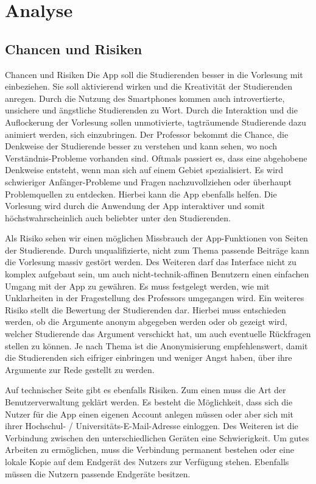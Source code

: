 \chapter{Analyse}
\label{chap:analyse}

\section{Chancen und Risiken}
\label{sec:chances}

Chancen und Risiken
Die App soll die Studierenden besser in die Vorlesung mit einbeziehen. Sie soll aktivierend wirken und die Kreativität der Studierenden anregen. Durch die Nutzung des Smartphones kommen auch introvertierte, unsichere und ängstliche Studierenden zu Wort. Durch die Interaktion und die Auflockerung der Vorlesung sollen unmotivierte, tagträumende Studierende dazu animiert werden, sich einzubringen. 
Der Professor bekommt die Chance, die Denkweise der Studierende besser zu verstehen und kann sehen, wo noch Verständnis-Probleme vorhanden sind. Oftmals passiert es, dass eine abgehobene Denkweise entsteht, wenn man sich auf einem Gebiet spezialisiert. Es wird schwieriger Anfänger-Probleme und Fragen nachzuvollziehen oder überhaupt Problemquellen zu entdecken. Hierbei kann die App ebenfalls helfen. Die Vorlesung wird durch die Anwendung der  App interaktiver und somit höchstwahrscheinlich auch beliebter unter den Studierenden.

Als Risiko sehen wir einen möglichen Missbrauch der App-Funktionen von Seiten der Studierende. Durch unqualifizierte, nicht zum Thema passende Beiträge kann die Vorlesung massiv gestört werden. 
Des Weiteren darf das Interface nicht zu komplex aufgebaut sein, um auch nicht-technik-affinen Benutzern einen einfachen Umgang mit der App zu gewähren. 
Es muss festgelegt werden, wie mit Unklarheiten in der Fragestellung des Professors umgegangen wird. Ein weiteres Risiko stellt die Bewertung der Studierenden dar. Hierbei muss entschieden werden, ob die Argumente anonym abgegeben werden oder ob gezeigt wird, welcher Studierende das Argument verschickt hat, um auch eventuelle Rückfragen stellen zu können. Je nach Thema ist die Anonymisierung empfehlenswert, damit die Studierenden sich eifriger einbringen und weniger Angst haben, über ihre Argumente zur Rede gestellt zu werden.

Auf technischer Seite gibt es ebenfalls Risiken. Zum einen muss die Art der Benutzerverwaltung geklärt werden. Es besteht die Möglichkeit, dass sich die Nutzer für die App einen eigenen Account anlegen müssen oder aber sich mit ihrer Hochschul- / Universitäts-E-Mail-Adresse einloggen. 
Des Weiteren ist die Verbindung zwischen den unterschiedlichen Geräten eine Schwierigkeit. Um gutes Arbeiten zu ermöglichen, muss die Verbindung permanent bestehen oder eine lokale Kopie auf dem Endgerät des Nutzers zur Verfügung stehen. Ebenfalls müssen die Nutzern passende Endgeräte besitzen.

